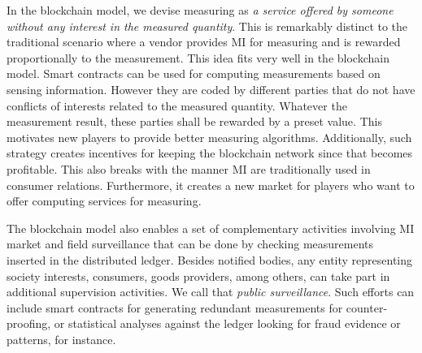 \documentclass[journal]{IEEEtran}
\begin{document}
In the blockchain model, we devise measuring as \emph{a service offered by someone without any interest in the measured quantity}. 
This is remarkably distinct to the traditional scenario where a vendor provides MI for measuring and is rewarded proportionally to the measurement. 
This idea fits very well in the blockchain model. 
Smart contracts can be used for computing measurements based on sensing information. 
However they are coded by different parties that do not have conflicts of interests related to the measured quantity. Whatever the measurement result, these parties shall be rewarded by a preset value. 
This motivates new players to provide better measuring algorithms.
Additionally, such strategy creates incentives for keeping the blockchain network since that becomes profitable. 
This also breaks with the manner MI are traditionally used in consumer relations.
Furthermore, it creates a new market for players who want to offer computing services for measuring. 

The blockchain model also enables a set of complementary activities involving MI market and field surveillance that can be done by checking measurements inserted in the distributed ledger. Besides notified bodies, any entity representing society interests, consumers, goods providers, among others, can take part in additional supervision activities. We call that \emph{public surveillance}. Such efforts can include smart contracts for generating redundant measurements for counter-proofing, or statistical analyses against the ledger looking for fraud evidence or patterns, for instance.



\end{document}
